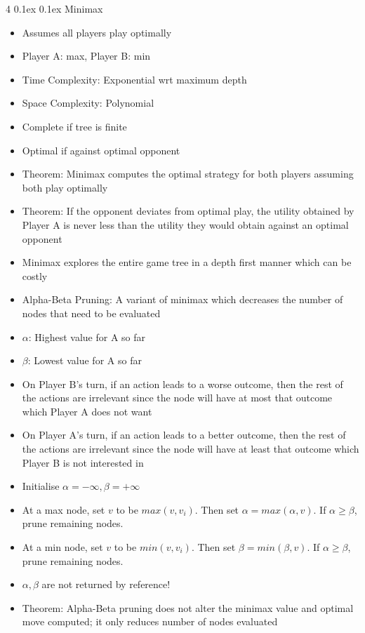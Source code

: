 \documentclass[10pt, landscape]{article}
\makeatletter
\renewcommand{\subsubsection}{\@startsection{subsubsection}{3}{0mm}%
  {0.1ex} %
  {0.1ex} %
  {\normalfont\small\bfseries}}
\makeatother
\begin{document}
\begin{multicols*}{4}
\subsubsection{Minimax}
\begin{itemize}
    \item Assumes all players play optimally
    \item Player A: max, Player B: min
    \item Time Complexity: Exponential wrt maximum depth
    \item Space Complexity: Polynomial
    \item Complete if tree is finite
    \item Optimal if against optimal opponent
    \item Theorem: Minimax computes the optimal strategy for both players assuming both play optimally
    \item Theorem: If the opponent deviates from optimal play, the utility obtained by Player A is never less than the utility they would obtain against an optimal opponent
    \item Minimax explores the entire game tree in a depth first manner which can be costly
    \item Alpha-Beta Pruning: A variant of minimax which decreases the number of nodes that need to be evaluated
    \item $\alpha$: Highest value for A so far
    \item $\beta$: Lowest value for A so far
    \item On Player B's turn, if an action leads to a worse outcome, then the rest of the actions are irrelevant since the node will have at most that outcome which Player A does not want
    \item On Player A's turn, if an action leads to a better outcome, then the rest of the actions are irrelevant since the node will have at least that outcome which Player B is not interested in
    \item Initialise $\alpha=-\infty, \beta=+\infty$
    \item At a max node, set $v$ to be $max(v, v_i)$. Then set $\alpha=max(\alpha, v)$. If $\alpha \geq \beta$, prune remaining nodes.
    \item At a min node, set $v$ to be $min(v, v_i)$. Then set $\beta = min(\beta, v)$. If $\alpha \geq \beta$, prune remaining nodes.
    \item $\alpha, \beta$ are not returned by reference!
    \item Theorem: Alpha-Beta pruning does not alter the minimax value and optimal move computed; it only reduces number of nodes evaluated

\end{itemize}
\end{multicols*}
\end{document}
